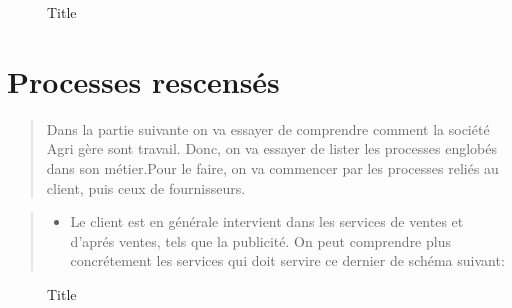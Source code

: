 \documentclass[a4paper]{report}
\begin{document}
\begin{doublespace}
\begin{figure}[H]
	\begin{center} 
		\caption{Title}
	\end{center}
\end{figure}

\section{Processes rescensés}

\begin{quote}
Dans la partie suivante on va essayer de comprendre comment la société
Agri gère sont travail. Donc, on va essayer de lister les processes
englobés dans son métier.Pour le faire, on va commencer par les
processes reliés au client, puis ceux de fournisseurs.
\end{quote}

\begin{quote}
\begin{itemize}
\item
  Le client est en générale intervient dans les services de ventes et
  d'aprés ventes, tels que la publicité. On peut comprendre plus
  concrétement les services qui doit servire ce dernier de schéma
  suivant:
\end{itemize}
\end{quote}

\begin{figure}[H] 
	\begin{center}
		\caption{Title}
	\end{center}
\end{figure}


\end{doublespace}
\end{document}

